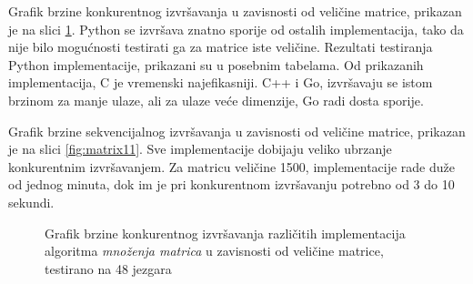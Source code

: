 \documentclass[12pt,oneside]{memoir}
\begin{document}
Grafik brzine konkurentnog izvršavanja u zavisnosti od veličine matrice, prikazan je na slici \ref{fig:matrix1}. Python se izvršava znatno sporije od ostalih implementacija, tako da nije bilo mogućnosti testirati ga za matrice iste veličine. Rezultati testiranja Python implementacije, prikazani su u posebnim tabelama. Od prikazanih implementacija, C je vremenski najefikasniji. C++ i Go, izvršavaju se istom brzinom za manje ulaze, ali za ulaze veće dimenzije, Go radi dosta sporije. 

Grafik brzine sekvencijalnog izvršavanja u zavisnosti od veličine matrice, prikazan je na slici \ref{fig:matrix11}. Sve implementacije dobijaju veliko ubrzanje konkurentnim izvršavanjem. Za matricu veličine 1500, implementacije rade duže od jednog minuta, dok im je pri konkurentnom izvršavanju potrebno od 3 do 10 sekundi.

\begin{figure}
\begin{center}


\caption{Grafik brzine konkurentnog izvršavanja različitih implementacija algoritma \textit{množenja matrica} u zavisnosti od veličine matrice, testirano na 48 jezgara}
\label{fig:matrix1}
\end{center}
\end{figure}
\end{document}
